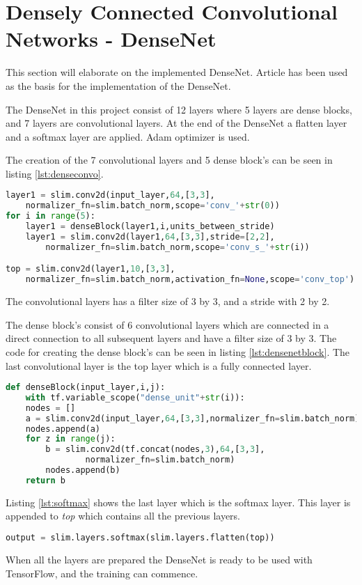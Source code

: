 \section{Densely Connected Convolutional Networks - DenseNet}

This section will elaborate on the implemented DenseNet. Article \citep{DENSE} has been used as the basis for the implementation of the DenseNet.

The DenseNet in this project consist of 12 layers where 5 layers are dense blocks, and 7 layers are convolutional layers. At the end of the DenseNet a flatten layer and a softmax layer are applied. Adam optimizer is used.

The creation of the 7 convolutional layers and 5 dense block's can be seen in listing \ref{lst:denseconvo}.

\begin{lstlisting}[language=Python, label=lst:denseconvo, caption=for loop which creates the dense block's mixed with the convolutional layers]
layer1 = slim.conv2d(input_layer,64,[3,3],
	normalizer_fn=slim.batch_norm,scope='conv_'+str(0))
for i in range(5):
	layer1 = denseBlock(layer1,i,units_between_stride)
	layer1 = slim.conv2d(layer1,64,[3,3],stride=[2,2],
		normalizer_fn=slim.batch_norm,scope='conv_s_'+str(i))

top = slim.conv2d(layer1,10,[3,3],
	normalizer_fn=slim.batch_norm,activation_fn=None,scope='conv_top')
\end{lstlisting}

The convolutional layers has a filter size of 3 by 3, and a stride with 2 by 2. 

The dense block's consist of 6 convolutional layers which are connected in a direct connection to all subsequent layers and have a filter size of 3 by 3. The code for creating the dense block's can be seen in listing \ref{lst:densenetblock}. The last convolutional layer is the top layer which is a fully connected layer.

\begin{lstlisting}[language=Python, label=lst:densenetblock, caption=DenseNet Block function]
def denseBlock(input_layer,i,j):
	with tf.variable_scope("dense_unit"+str(i)):
	nodes = []
	a = slim.conv2d(input_layer,64,[3,3],normalizer_fn=slim.batch_norm)
	nodes.append(a)
	for z in range(j):
		b = slim.conv2d(tf.concat(nodes,3),64,[3,3],
				normalizer_fn=slim.batch_norm)
		nodes.append(b)
	return b
\end{lstlisting}

Listing \ref{lst:softmax} shows the last layer which is the softmax layer. This layer is appended to \emph{top} which contains all the previous layers.

\begin{lstlisting}[language=Python, label=lst:softmax, caption=Softmax layer appended to the end of the DenseNet]
output = slim.layers.softmax(slim.layers.flatten(top))
\end{lstlisting}

When all the layers are prepared the DenseNet is ready to be used with TensorFlow, and the training can commence.